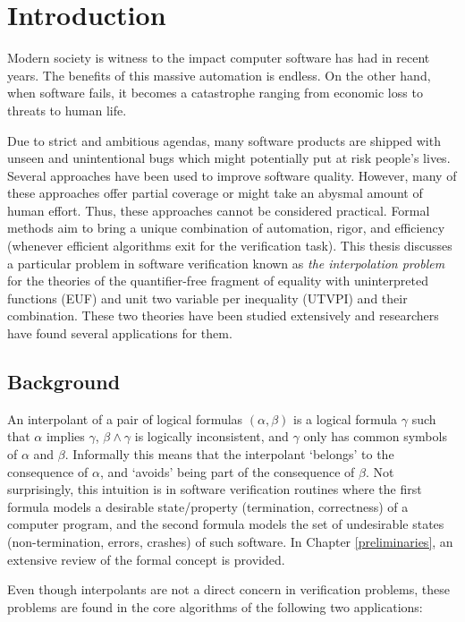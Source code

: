 \chapter{Introduction}

Modern society is witness to the impact computer software 
has had in recent years. The benefits of this massive 
automation is endless. On the other hand, when software 
fails, it becomes a catastrophe ranging from economic loss
to threats to human life. 

Due to strict and ambitious agendas, many software products
are shipped with unseen and unintentional bugs which might potentially put
at risk people's lives. Several approaches have been 
used to improve software quality. However, many of these approaches 
offer partial coverage or might take an abysmal amount of human effort. Thus, these approaches cannot be considered practical. 
Formal methods aim to bring a unique combination of automation, rigor, and 
efficiency (whenever efficient algorithms exit for the verification task). 
This thesis discusses a particular problem in software verification
known as \emph{the interpolation problem} for the theories of the quantifier-free
fragment of equality with uninterpreted functions (EUF) and unit two variable per
inequality (UTVPI) and their combination. These two theories have been 
studied extensively and researchers have found several applications for them. 

\section{Background}

An interpolant of a pair of logical formulas $(\alpha, \beta)$ 
is a logical formula $\gamma$
such that $\alpha$ implies $\gamma$, $\beta \land \gamma$ is logically
inconsistent, and $\gamma$ only has common symbols of $\alpha$ and $\beta$.
Informally this means that the 
interpolant `belongs' to the consequence of $\alpha$, 
and `avoids' being part of the consequence of $\beta$. 
Not surprisingly, this intuition is in software verification 
routines where the first formula models a desirable state/property
(termination, correctness) of a computer program, and the second 
formula models the set of undesirable states (non-termination, 
errors, crashes) of such software. In Chapter 
\ref{preliminaries}, an extensive review of the formal concept 
is provided.

Even though interpolants are not a direct concern in verification
problems, these problems are found in the core algorithms of the 
following two applications:

